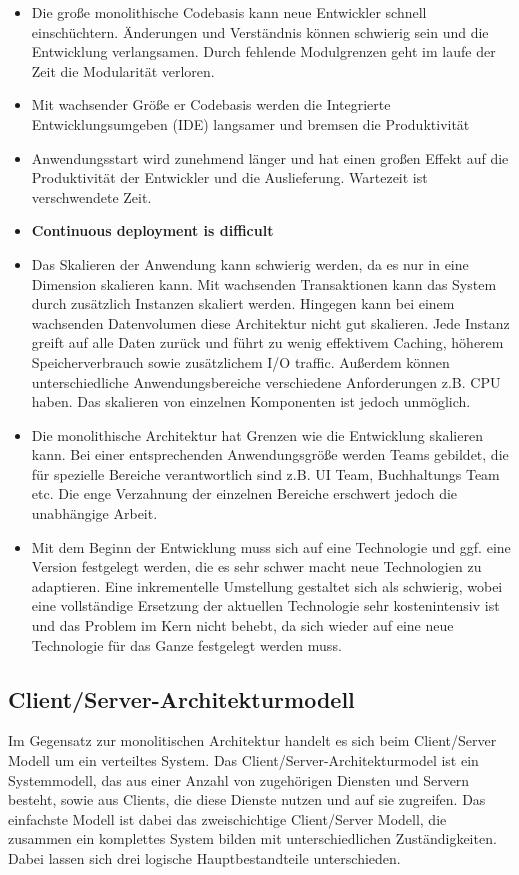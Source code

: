 	\begin{itemize}
	\item Die große monolithische Codebasis kann neue Entwickler schnell einschüchtern. Änderungen und Verständnis können schwierig sein und die Entwicklung verlangsamen. Durch fehlende Modulgrenzen geht im laufe der Zeit die Modularität verloren.
	\item Mit wachsender Größe er Codebasis werden die Integrierte Entwicklungsumgeben (IDE) langsamer und bremsen die Produktivität
	\item Anwendungsstart wird zunehmend länger und hat einen großen Effekt auf die Produktivität der Entwickler und die Auslieferung. Wartezeit ist verschwendete Zeit.
	\item \textbf{Continuous deployment is difficult }
	\item Das Skalieren der Anwendung kann schwierig werden, da es nur in eine Dimension skalieren kann. Mit wachsenden Transaktionen kann das System durch zusätzlich Instanzen skaliert werden. Hingegen kann bei einem wachsenden Datenvolumen diese Architektur nicht gut skalieren. Jede Instanz greift auf alle Daten zurück und führt zu wenig effektivem Caching, höherem Speicherverbrauch sowie zusätzlichem I/O traffic. Außerdem können unterschiedliche Anwendungsbereiche verschiedene Anforderungen z.B. CPU haben. Das skalieren von einzelnen Komponenten ist jedoch unmöglich.
	\item Die monolithische Architektur hat Grenzen wie die Entwicklung skalieren kann. Bei einer entsprechenden Anwendungsgröße werden Teams gebildet, die für spezielle Bereiche verantwortlich sind z.B. UI Team, Buchhaltungs Team etc.
	Die enge Verzahnung der einzelnen Bereiche erschwert jedoch die unabhängige Arbeit.
	\item Mit dem Beginn der Entwicklung muss sich auf eine Technologie und ggf. eine Version festgelegt werden, die es sehr schwer macht neue Technologien zu adaptieren. Eine inkrementelle Umstellung gestaltet sich als schwierig, wobei eine vollständige Ersetzung der aktuellen Technologie sehr kostenintensiv ist und das Problem im Kern nicht behebt, da sich wieder auf eine neue Technologie für das Ganze festgelegt werden muss.
	\end{itemize}
	
	\subsection{Client/Server-Architekturmodell}
	Im Gegensatz zur monolitischen Architektur handelt es sich beim Client/Server Modell um ein verteiltes System.
	Das Client/Server-Architekturmodel ist ein Systemmodell, das aus einer Anzahl von zugehörigen Diensten und Servern besteht, sowie aus Clients, die diese Dienste nutzen und auf sie zugreifen. Das einfachste Modell ist dabei das zweischichtige Client/Server Modell, die zusammen ein komplettes System bilden mit unterschiedlichen Zuständigkeiten. \\
	Dabei lassen sich drei logische Hauptbestandteile unterschieden.
	
